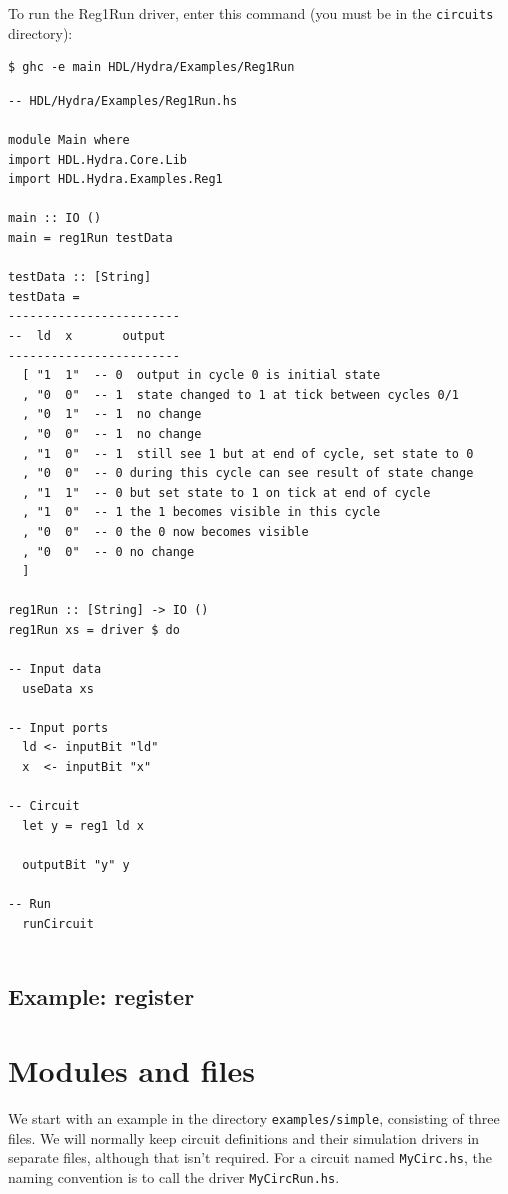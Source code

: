 \documentclass[]{svmono}
\begin{document}
To run the Reg1Run driver, enter this command (you must be in the
\texttt{circuits} directory):

\begin{verbatim}
$ ghc -e main HDL/Hydra/Examples/Reg1Run
\end{verbatim}


\begin{verbatim}
-- HDL/Hydra/Examples/Reg1Run.hs

module Main where
import HDL.Hydra.Core.Lib
import HDL.Hydra.Examples.Reg1

main :: IO ()
main = reg1Run testData

testData :: [String]
testData =
------------------------
--  ld  x       output
------------------------
  [ "1  1"  -- 0  output in cycle 0 is initial state
  , "0  0"  -- 1  state changed to 1 at tick between cycles 0/1
  , "0  1"  -- 1  no change
  , "0  0"  -- 1  no change
  , "1  0"  -- 1  still see 1 but at end of cycle, set state to 0
  , "0  0"  -- 0 during this cycle can see result of state change
  , "1  1"  -- 0 but set state to 1 on tick at end of cycle
  , "1  0"  -- 1 the 1 becomes visible in this cycle
  , "0  0"  -- 0 the 0 now becomes visible
  , "0  0"  -- 0 no change
  ]

reg1Run :: [String] -> IO ()
reg1Run xs = driver $ do

-- Input data
  useData xs

-- Input ports
  ld <- inputBit "ld"
  x  <- inputBit "x"

-- Circuit
  let y = reg1 ld x

  outputBit "y" y

-- Run
  runCircuit


\end{verbatim}
\subsection*{Example: register}
\label{sec:org8aebf24}
\section*{Modules and files}
\label{sec:org193f16a}

We start with an example in the directory \texttt{examples/simple},
consisting of three files.  We will normally keep circuit definitions
and their simulation drivers in separate files, although that isn't
required.  For a circuit named \texttt{MyCirc.hs}, the naming convention is
to call the driver \texttt{MyCircRun.hs}.
\end{document}
